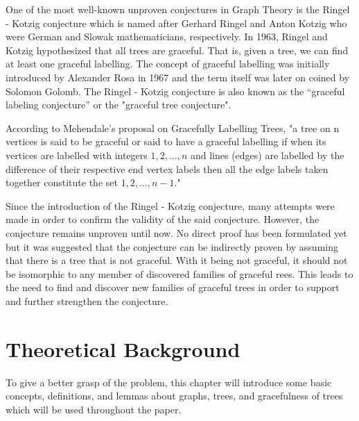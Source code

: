 \documentclass[a4paper, 11pt]{article}
\begin{document}
\par One of the most well-known unproven conjectures in Graph Theory is the Ringel - Kotzig conjecture which is named after Gerhard Ringel and Anton Kotzig who were German and Slowak mathematicians, respectively. In 1963, Ringel and Kotzig hypothesized that all trees are graceful. That is, given a tree, we can find at least one graceful labelling. The concept of graceful labelling was initially introduced by Alexander Rosa in 1967 and the term itself was later on coined by Solomon Golomb. The Ringel - Kotzig conjecture is also known as the “graceful labeling conjecture” or the "graceful tree conjecture". \par
According to Mehendale’s proposal on Gracefully Labelling Trees, "a tree on n vertices is said to be graceful or said to have a graceful labelling if when its vertices are labelled with integers ${1, 2,\ldots, n}$ and lines (edges) are labelled by the difference of their respective end vertex labels then all the edge labels taken together constitute the set ${1, 2,\ldots, n-1}$." \par
Since the introduction of the Ringel - Kotzig conjecture, many attempts were made in order to confirm the validity of the said conjecture. However, the conjecture remains unproven until now. No direct proof has been formulated yet but it was suggested that the conjecture can be indirectly proven by assuming that there is a tree that is not graceful. With it being not graceful, it should not be isomorphic to any member of discovered families of graceful rees. This leads to the need to find and discover new families of graceful trees in order to support and further strengthen the conjecture. \par


\newpage
\section{Theoretical Background}
To give a better grasp of the problem, this chapter will introduce some basic concepts, definitions, and lemmas about graphs, trees, and gracefulness of trees which will be used throughout the paper. 
\end{document}
